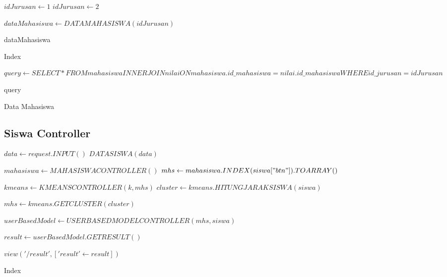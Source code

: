 \begin{algorithm}[H]
  \begin{algorithmic}[1]
        \State $idJurusan \gets 1$ 
            \State $idJurusan \gets 2$
        \EndIf
        
        \State $dataMahasiswa \gets DATAMAHASISWA(idJurusan)$
        
        \State \Return dataMahasiswa
    \EndProcedure
  \end{algorithmic} 
  \caption{Index}
  \label{alg:index mahasiswa controller}
\end{algorithm}

\begin{algorithm}[H]
  \begin{algorithmic}[1]
        \State $query \gets SELECT * FROM mahasiswa INNER JOIN nilai ON mahasiswa.id\_mahasiswa=nilai.id\_mahasiswa WHERE id\_jurusan = idJurusan$
        
        \State \Return query
    \EndProcedure
  \end{algorithmic} 
  \caption{Data Mahasiswa}
  \label{alg:data mahasiswa controller}
\end{algorithm}

\subsection{Siswa Controller}
\label{subsec:siswa controller}

\begin{algorithm}[H]
  \begin{algorithmic}[1]
        \State $data \gets request.INPUT()$
        \State $DATASISWA(data)$
        
        \State $mahasiswa \gets MAHASISWACONTROLLER()$
        \State $mhs \gets mahasiswa.INDEX(siswa["btn"]).TOARRAY()$
        
        \State $kmeans \gets KMEANSCONTROLLER(k, mhs)$ 
        \State $cluster \gets kmeans.HITUNGJARAKSISWA(siswa)$
        
        \State $mhs \gets kmeans.GETCLUSTER(cluster)$
        
        \State $userBasedModel \gets USERBASEDMODELCONTROLLER(mhs, siswa)$
        
        \State $result \gets userBasedModel.GETRESULT()$
        
        \State \Return $view('/result', ['result' \gets result])$
    \EndProcedure
  \end{algorithmic} 
  \caption{Index}
  \label{alg:index siswa controller}
\end{algorithm}

